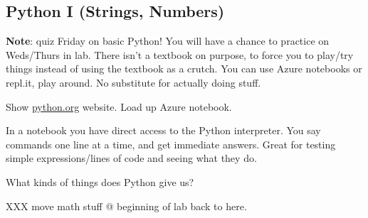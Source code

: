 \documentclass{article}
\begin{document}
\subsection*{Python I (Strings, Numbers)}

\textbf{Note}: quiz Friday on basic Python!  You will have a chance to
practice on Weds/Thurs in lab.  There isn't a textbook on purpose, to
force you to play/try things instead of using the textbook as a
crutch.  You can use Azure notebooks or repl.it, play around.  No
substitute for actually doing stuff.

Show \url{python.org} website.  Load up Azure notebook.

In a notebook you have direct access to the Python interpreter.  You
say commands one line at a time, and get immediate answers.  Great for
testing simple expressions/lines of code and seeing what they do.

What kinds of things does Python give us?

XXX move math stuff @ beginning of lab back to here.
\end{document}
